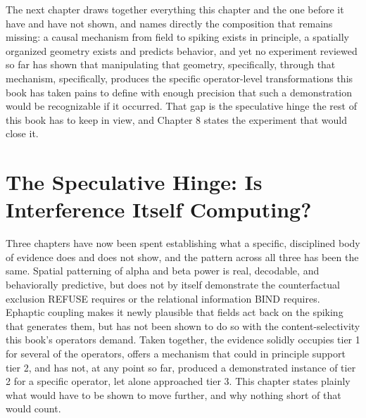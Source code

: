 \documentclass[11pt]{book}
\begin{document}
The next chapter draws together everything this chapter and the one before it have and have not shown, and names directly the composition that remains missing: a causal mechanism from field to spiking exists in principle, a spatially organized geometry exists and predicts behavior, and yet no experiment reviewed so far has shown that manipulating that geometry, specifically, through that mechanism, specifically, produces the specific operator-level transformations this book has taken pains to define with enough precision that such a demonstration would be recognizable if it occurred. That gap is the speculative hinge the rest of this book has to keep in view, and Chapter 8 states the experiment that would close it.

\chapter{The Speculative Hinge: Is Interference Itself Computing?}

Three chapters have now been spent establishing what a specific, disciplined body of evidence does and does not show, and the pattern across all three has been the same. Spatial patterning of alpha and beta power is real, decodable, and behaviorally predictive, but does not by itself demonstrate the counterfactual exclusion REFUSE requires or the relational information BIND requires. Ephaptic coupling makes it newly plausible that fields act back on the spiking that generates them, but has not been shown to do so with the content-selectivity this book's operators demand. Taken together, the evidence solidly occupies tier 1 for several of the operators, offers a mechanism that could in principle support tier 2, and has not, at any point so far, produced a demonstrated instance of tier 2 for a specific operator, let alone approached tier 3. This chapter states plainly what would have to be shown to move further, and why nothing short of that would count.
\end{document}
